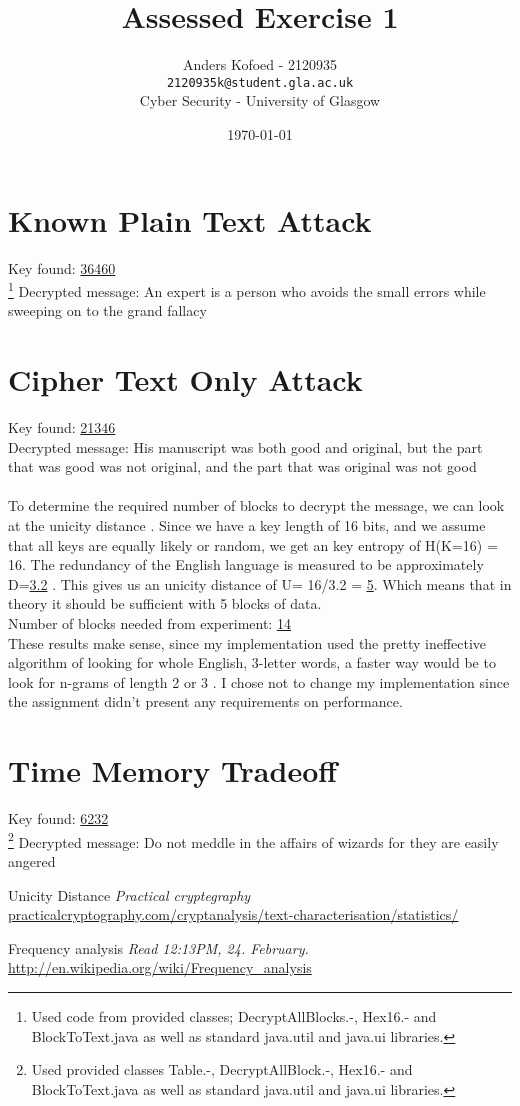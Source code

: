 \documentclass[11pt]{article}
\title{\textbf{Assessed Exercise 1 }}
\author{Anders Kofoed - 2120935\\
\texttt{2120935k@student.gla.ac.uk}\\
	Cyber Security - University of Glasgow}
\date{\today}
\begin{document}
\maketitle

\section{Known Plain Text Attack}
Key found: \underline{36460}\\\footnote{Used code from provided classes; DecryptAllBlocks.-, Hex16.- and BlockToText.java as well as standard java.util and java.ui libraries.}
Decrypted message: An expert is a person who avoids the small errors while sweeping on to the grand fallacy


\section{Cipher Text Only Attack}
Key found: \underline{21346}\\
Decrypted message: His manuscript was both good and original, but the part that was good was not original, and the part that was original was not good \\
\\
To determine the required number of blocks to decrypt the message, we can look at the unicity distance \cite{ud}. Since we have a key length of 16 bits, and we assume that all keys are equally likely or random, we get an key entropy of H(K=16) = 16. The redundancy of the English language is measured to be approximately D=\uline{3.2} \cite{ud}. This gives us an unicity distance of U= 16/3.2 = \underline{\underline{5}}. Which means that in theory it should be sufficient with 5 blocks of data.\\	  
Number of blocks needed from experiment:  \underline{\underline{14}}\\
These results make sense, since my implementation used the pretty ineffective algorithm of looking for whole English, 3-letter words, a faster way would be to look for n-grams of length 2 or 3 \cite{ngram}. I chose not to change my implementation since the assignment didn't present any requirements on performance.

\section{Time Memory Tradeoff}
Key found:  \underline{6232}\\ \footnote{Used provided classes Table.-, DecryptAllBlock.-, Hex16.- and BlockToText.java as well as standard java.util and java.ui libraries.}
Decrypted message: Do not meddle in the affairs of wizards for they are easily angered

\begin{thebibliography}{N}\label{sec:references}
 Unicity Distance \textit{Practical cryptegraphy} \url{practicalcryptography.com/cryptanalysis/text-characterisation/statistics/}

 Frequency analysis \textit{Read 12:13PM, 24. February.} \url{http://en.wikipedia.org/wiki/Frequency_analysis}

\end{thebibliography}
\end{document}
